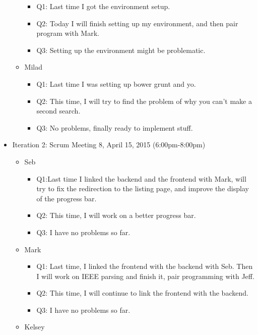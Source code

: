 \documentclass[]{article}
\begin{document}
\begin{itemize}
\begin{itemize}
    \begin{itemize}
    \itemsep1pt\parskip0pt
    \item
      Q1: Last time I got the environment setup.
    \item
      Q2: Today I will finish setting up my environment, and then pair
      program with Mark.
    \item
      Q3: Setting up the environment might be problematic.
    \end{itemize}
  \item
    Milad

    \begin{itemize}
    \itemsep1pt\parskip0pt
    \item
      Q1: Last time I was setting up bower grunt and yo.
    \item
      Q2: This time, I will try to find the problem of why you can't
      make a second search.
    \item
      Q3: No problems, finally ready to implement stuff.
    \end{itemize}
  \end{itemize}
\item
  Iteration 2: Scrum Meeting 8, April 15, 2015 (6:00pm-8:00pm)

  \begin{itemize}
  \itemsep1pt\parskip0pt
  \item
    Seb

    \begin{itemize}
    \itemsep1pt\parskip0pt
    \item
      Q1:Last time I linked the backend and the frontend with Mark, will
      try to fix the redirection to the listing page, and improve the
      display of the progress bar.
    \item
      Q2: This time, I will work on a better progress bar.
    \item
      Q3: I have no problems so far.
    \end{itemize}
  \item
    Mark

    \begin{itemize}
    \itemsep1pt\parskip0pt
    \item
      Q1: Last time, I linked the frontend with the backend with Seb.
      Then I will work on IEEE parsing and finish it, pair programming
      with Jeff.
    \item
      Q2: This time, I will continue to link the frontend with the
      backend.
    \item
      Q3: I have no problems so far.
    \end{itemize}
  \item
    Kelsey


\end{itemize}
\end{itemize}
\end{document}
